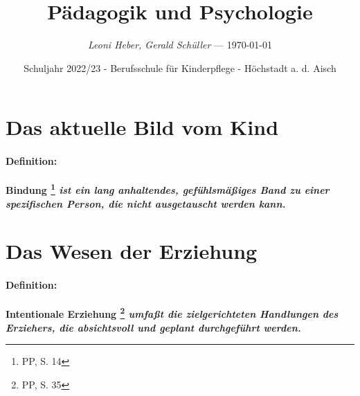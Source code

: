 \documentclass[10pt,a4paper]{article}
\newcommand\svthema{Pädagogik und Psychologie}
\newcommand\svperson{Leoni Heber, Gerald Schüller}
\newcommand\svdatum{\today}
\newcommand\lvtyp{Schuljahr 2022/23}
\newcommand\lvinst{Berufsschule für Kinderpflege - Höchstadt a. d. Aisch}
\begin{document}
\title{ \textbf{\color{blue}\svthema} }
\author{ \textsl{\color{red}\svperson} --- \svdatum }
\date{ \small {\lvtyp} - {\lvinst} }
\maketitle

\tableofcontents

\newpage
\section{Das aktuelle Bild vom Kind}

\paragraph{\color{coquelicot} {Definition:}} \bf{Bindung}
\footnote{\label{Bindung} PP, S. 14} 
\sl{ist ein lang anhaltendes, gefühlsmäßiges Band zu einer spezifischen Person,
die nicht ausgetauscht werden kann.}

\newpage
\section{Das Wesen der Erziehung}

\paragraph{\color{coquelicot} {Definition:}} \bf{Intentionale Erziehung}
\footnote{\label{Intensionale} PP, S. 35} 
\sl{umfaßt die zielgerichteten Handlungen des Erziehers, die absichtsvoll und
geplant durchgeführt werden.}

\printindex
\end{document}
